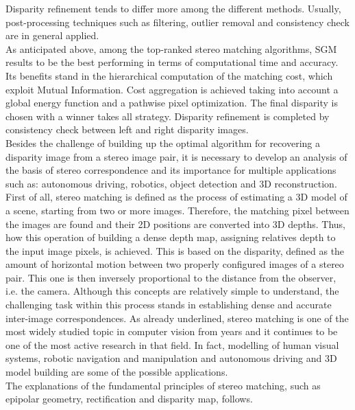 Disparity refinement tends to differ more among the different methods. Usually, post-processing techniques such as filtering, outlier removal and consistency check are in general applied.\\
As anticipated above, among the top-ranked stereo matching algorithms, SGM results to be the best performing in terms of computational time and accuracy. 
Its benefits stand in the hierarchical computation of the matching cost, which exploit Mutual Information. 
Cost aggregation is achieved taking into account a global energy function and a pathwise pixel optimization. 
The final disparity is chosen with a winner takes all strategy. 
Disparity refinement is completed by consistency check between left and right disparity images. \\
Besides the challenge of building up the optimal algorithm for recovering a disparity image from a stereo image pair, it is necessary to develop an analysis of the basis of stereo correspondence and its importance for multiple applications such as: autonomous driving, robotics, object detection and 3D reconstruction. \\
First of all, stereo matching is defined as the process of estimating a 3D model of a scene, starting from two or more images. 
Therefore, the matching pixel between the images are found and their 2D positions are converted into 3D depths. 
Thus, how this operation of building a dense depth map, assigning relatives depth to the input image pixels, is achieved. 
This is based on the disparity, defined as the amount of horizontal motion between two properly configured images of a stereo pair. 
This one is then inversely proportional to the distance from the observer, i.e. the camera. 
Although this concepts are relatively simple to understand, the challenging task within this process stands in establishing dense and accurate inter-image correspondences\citep{Szeliski2011}.
As already underlined, stereo matching is one of the most widely studied topic in computer vision from years and it continues to be one of the most active research in that field. 
In fact, modelling of human visual systems, robotic navigation and manipulation and autonomous driving \citep{Poggi2019} and 3D model building are some of the possible applications.\\
The explanations of the fundamental principles of stereo matching, such as epipolar geometry, rectification and disparity map, follows.\\

